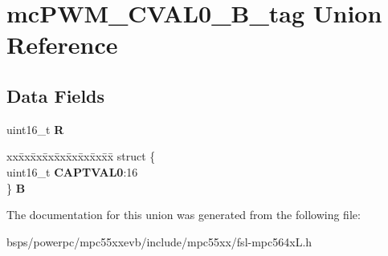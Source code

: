 \hypertarget{unionmcPWM__CVAL0__16B__tag}{}\section{mc\+P\+W\+M\+\_\+\+C\+V\+A\+L0\+\_\+B\+\_\+tag Union Reference}
\label{unionmcPWM__CVAL0__16B__tag}
\subsection*{Data Fields}
\begin{DoxyCompactItemize}
\item 
\mbox{\label{unionmcPWM__CVAL0__16B__tag_aa3a67164a3b84b84129ddaaaff3f137d}} 
uint16\+\_\+t {\bfseries R}
\item 
\mbox{\label{unionmcPWM__CVAL0__16B__tag_a016947fdf6471ec86c2af3aa41d61d2c}} 
\begin{tabbing}
xx\=xx\=xx\=xx\=xx\=xx\=xx\=xx\=xx\=\kill
struct \{\\
\>uint16\_t {\bfseries CAPTVAL0}:16\\
\} {\bfseries B}\\

\end{tabbing}\end{DoxyCompactItemize}


The documentation for this union was generated from the following file\+:\begin{DoxyCompactItemize}
\item 
bsps/powerpc/mpc55xxevb/include/mpc55xx/fsl-\/mpc564x\+L.\+h\end{DoxyCompactItemize}
